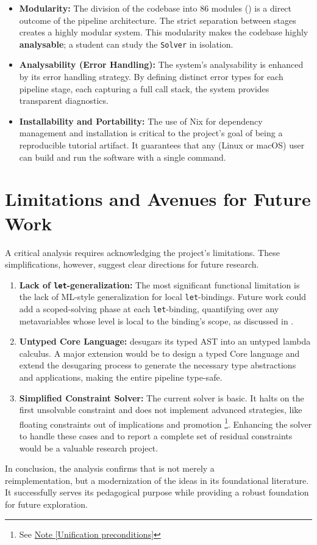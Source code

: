 \begin{itemize}
    \item \textbf{Modularity:} The division of the codebase into 86 modules () is a direct outcome of the pipeline architecture. The strict separation between stages creates a highly modular system. This modularity makes the codebase highly \textbf{analysable}; a student can study the \texttt{Solver} in isolation.
    \item \textbf{Analysability (Error Handling):} The system's analysability is enhanced by its error handling strategy. By defining distinct error types for each pipeline stage, each capturing a full call stack, the system provides transparent diagnostics.
    \item \textbf{Installability and Portability:} The use of Nix for dependency management and installation is critical to the project's goal of being a reproducible tutorial artifact. It guarantees that any (Linux or macOS) user can build and run the software with a single command.
\end{itemize}

\section{Limitations and Avenues for Future Work}
\label{sec:Discussion:Limitations}
A critical analysis requires acknowledging the project's limitations. These simplifications, however, suggest clear directions for future research.

\begin{enumerate}
    \item \textbf{Lack of \texttt{let}-generalization:} The most significant functional limitation is the lack of ML-style generalization for local \texttt{let}-bindings. Future work could add a scoped-solving phase at each \texttt{let}-binding, quantifying over any metavariables whose level is local to the binding's scope, as discussed in \cite{wits-type-inference-using-constraints}.

    \item \textbf{Untyped Core Language:} \Arralac desugars its typed AST into an untyped lambda calculus. A major extension would be to design a typed Core language and extend the desugaring process to generate the necessary type abstractions and applications, making the entire pipeline type-safe.

    \item \textbf{Simplified Constraint Solver:} The current solver is basic. It halts on the first unsolvable constraint and does not implement advanced strategies, like floating constraints out of implications and promotion \footnote{See \href{https://github.com/ghc/ghc/blob/ed38c09bd89307a7d3f219e1965a0d9743d0ca73/compiler/GHC/Tc/Utils/Unify.hs\#L2589}{Note [Unification preconditions]}}. Enhancing the solver to handle these cases and to report a complete set of residual constraints would be a valuable research project.
\end{enumerate}

In conclusion, the analysis confirms that \Arralac is not merely a \\ reimplementation, but a modernization of the ideas in its foundational literature. It successfully serves its pedagogical purpose while providing a robust foundation for future exploration.